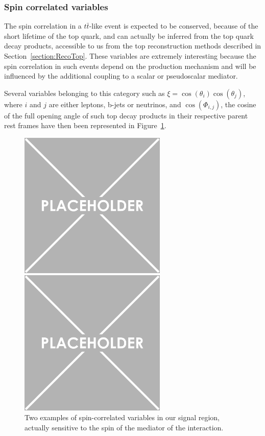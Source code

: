 \documentclass[a4paper, 10pt, openright]{report}
\begin{document}
\subsubsection*{Spin correlated variables}

The spin correlation in a $t \bar t$-like event is expected to be conserved, because of the short lifetime of the top quark, and can actually be inferred from the top quark decay products, accessible to us from the top reconstruction methods described in Section~\ref{section:RecoTop}. These variables are extremely interesting because the spin correlation in such events depend on the production mechanism and will be influenced by the additional coupling to a scalar or pseudoscalar mediator.

Several variables belonging to this category such as $\xi = \cos(\theta_i) \cos(\theta_j)$, where $i$ and $j$ are either leptons, b-jets or neutrinos, and $\cos(\Phi_{i,j})$, the cosine of the full opening angle of such top decay products in their respective parent rest frames have then been represented in Figure~\ref{fig:SRdisc2}.

\begin{figure}[htbp]
\centering
\begin{minipage}[b]{.48\textwidth}
\includegraphics[width=7cm, height=7cm]{figs/placeholder.png}
\end{minipage}\hfill
\begin{minipage}[b]{.48\textwidth}
\includegraphics[width=7cm, height=7cm]{figs/placeholder.png}
\end{minipage} \hfill
\caption{Two examples of spin-correlated variables in our signal region, actually sensitive to the spin of the mediator of the interaction.}
\label{fig:SRdisc2}
\end{figure}
\end{document}
